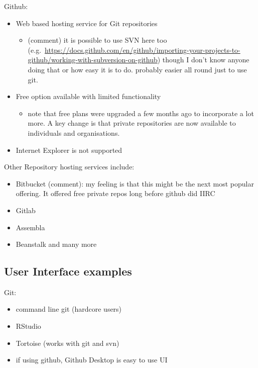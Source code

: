 \documentclass[
]{article}
\providecommand{\tightlist}{%
  \setlength{\itemsep}{0pt}\setlength{\parskip}{0pt}}
\begin{document}
Github:

\begin{itemize}
\tightlist
\item
  Web based hosting service for Git repositories

  \begin{itemize}
  \tightlist
  \item
    (comment) it is possible to use SVN here too
    (e.g.~\url{https://docs.github.com/en/github/importing-your-projects-to-github/working-with-subversion-on-github})
    though I don't know anyone doing that or how easy it is to do.
    probably easier all round just to use git.
  \end{itemize}
\item
  Free option available with limited functionality

  \begin{itemize}
  \tightlist
  \item
    note that free plans were upgraded a few months ago to incorporate a
    lot more. A key change is that private repositories are now
    available to individuals and organisations.
  \end{itemize}
\item
  Internet Explorer is not supported
\end{itemize}

Other Repository hosting services include:

\begin{itemize}
\tightlist
\item
  Bitbucket (comment): my feeling is that this might be the next most
  popular offering. It offered free private repos long before github did
  IIRC
\item
  Gitlab
\item
  Assembla
\item
  Beanstalk and many more
\end{itemize}

\hypertarget{user-interface-examples}{%
\subsection{User Interface examples}\label{user-interface-examples}}

Git:

\begin{itemize}
\tightlist
\item
  command line git (hardcore users)
\item
  RStudio
\item
  Tortoise (works with git and svn)
\item
  if using github, Github Desktop is easy to use UI
\end{itemize}
\end{document}
